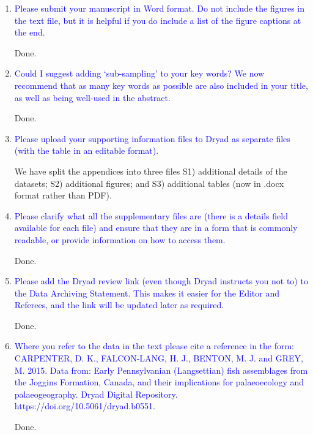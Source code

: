 \documentclass[12pt,letterpaper]{article}
\begin{document}
\begin{enumerate}

\item{\textcolor{blue}{Please submit your manuscript in Word format. Do not include the figures in the text file, but it is helpful if you do include a list of the figure captions at the end.}}

Done.

\item{\textcolor{blue}{Could I suggest adding ‘sub-sampling’ to your key words? We now recommend that as many key words as possible are also included in your title, as well as being well-used in the abstract.}}

Done.

\item{\textcolor{blue}{Please upload your supporting information files to Dryad as separate files (with the table in an editable format).}}

We have split the appendices into three files S1) additional details of the datasets; S2) additional figures; and S3) additional tables (now in .docx format rather than PDF).

\item{\textcolor{blue}{Please clarify what all the supplementary files are (there is a details field available for each file) and ensure that they are in a form that is commonly readable, or provide information on how to access them.}}

Done. 

\item{\textcolor{blue}{Please add the Dryad review link (even though Dryad instructs you not to) to the Data Archiving Statement. This makes it easier for the Editor and Referees, and the link will be updated later as required.}}

Done.

\item{\textcolor{blue}{Where you refer to the data in the text please cite a reference in the form: CARPENTER, D. K., FALCON-LANG, H. J., BENTON, M. J. and GREY, M. 2015. Data
from: Early Pennsylvanian (Langsettian) fish assemblages from the Joggins
Formation, Canada, and their implications for palaeoecology and palaeogeography.
Dryad Digital Repository. https://doi.org/10.5061/dryad.b0551.}}

Done.

\end{enumerate}
\end{document}

